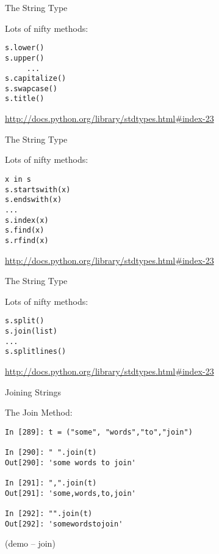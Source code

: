 \documentclass{beamer}
\begin{document}
\begin{frame}[fragile]{The String Type}

{\Large Lots of nifty methods:}

\begin{verbatim}
s.lower()
s.upper()
     ...
s.capitalize()
s.swapcase()
s.title()
\end{verbatim}

\url{http://docs.python.org/library/stdtypes.html#index-23}

\end{frame} 

\begin{frame}[fragile]{The String Type}

{\Large Lots of nifty methods:}

\begin{verbatim}
x in s
s.startswith(x)
s.endswith(x)
...
s.index(x)
s.find(x)
s.rfind(x)
\end{verbatim}

\url{http://docs.python.org/library/stdtypes.html#index-23}

\end{frame} 

\begin{frame}[fragile]{The String Type}

{\Large Lots of nifty methods:}

\begin{verbatim}
s.split()
s.join(list)
...
s.splitlines()
\end{verbatim}

\url{http://docs.python.org/library/stdtypes.html#index-23}
\vfill

\end{frame} 

\begin{frame}[fragile]{Joining Strings}

{\Large The Join Method:}

\vfill
\begin{verbatim}
In [289]: t = ("some", "words","to","join")

In [290]: " ".join(t)
Out[290]: 'some words to join'

In [291]: ",".join(t)
Out[291]: 'some,words,to,join'

In [292]: "".join(t)
Out[292]: 'somewordstojoin'
\end{verbatim}

\vfill
(demo -- join)

\end{frame} 
\end{document}

